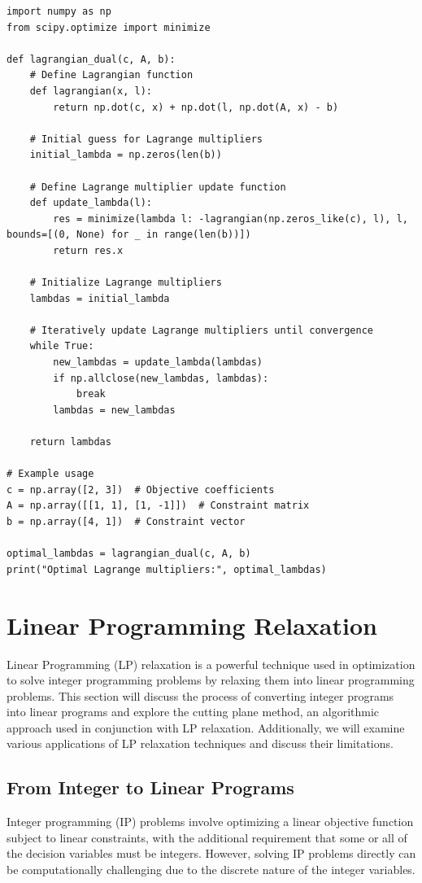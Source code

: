 \documentclass[12pt]{book} %
\begin{document}
\begin{lstlisting}
import numpy as np
from scipy.optimize import minimize

def lagrangian_dual(c, A, b):
    # Define Lagrangian function
    def lagrangian(x, l):
        return np.dot(c, x) + np.dot(l, np.dot(A, x) - b)
    
    # Initial guess for Lagrange multipliers
    initial_lambda = np.zeros(len(b))
    
    # Define Lagrange multiplier update function
    def update_lambda(l):
        res = minimize(lambda l: -lagrangian(np.zeros_like(c), l), l, bounds=[(0, None) for _ in range(len(b))])
        return res.x
    
    # Initialize Lagrange multipliers
    lambdas = initial_lambda
    
    # Iteratively update Lagrange multipliers until convergence
    while True:
        new_lambdas = update_lambda(lambdas)
        if np.allclose(new_lambdas, lambdas):
            break
        lambdas = new_lambdas
    
    return lambdas

# Example usage
c = np.array([2, 3])  # Objective coefficients
A = np.array([[1, 1], [1, -1]])  # Constraint matrix
b = np.array([4, 1])  # Constraint vector

optimal_lambdas = lagrangian_dual(c, A, b)
print("Optimal Lagrange multipliers:", optimal_lambdas)
\end{lstlisting}

\section{Linear Programming Relaxation}

Linear Programming (LP) relaxation is a powerful technique used in optimization to solve integer programming problems by relaxing them into linear programming problems. This section will discuss the process of converting integer programs into linear programs and explore the cutting plane method, an algorithmic approach used in conjunction with LP relaxation. Additionally, we will examine various applications of LP relaxation techniques and discuss their limitations.

\subsection{From Integer to Linear Programs}

Integer programming (IP) problems involve optimizing a linear objective function subject to linear constraints, with the additional requirement that some or all of the decision variables must be integers. However, solving IP problems directly can be computationally challenging due to the discrete nature of the integer variables.
\end{document}
